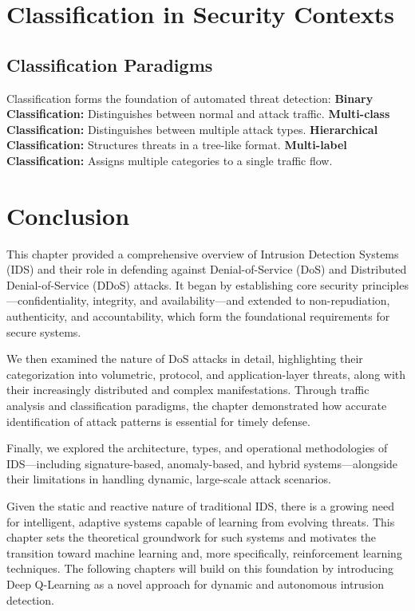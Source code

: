 \documentclass[12pt]{report}
\begin{document}
\section{Classification in Security Contexts}
\subsection{Classification Paradigms}
Classification forms the foundation of automated threat detection:
\textbf{Binary Classification:} Distinguishes between normal and attack traffic.
\textbf{Multi-class Classification:} Distinguishes between multiple attack types.
\textbf{Hierarchical Classification:} Structures threats in a tree-like format.
\textbf{Multi-label Classification:} Assigns multiple categories to a single traffic flow.

\section{Conclusion}

This chapter provided a comprehensive overview of Intrusion Detection Systems (IDS) and their role in defending against Denial-of-Service (DoS) and Distributed Denial-of-Service (DDoS) attacks. It began by establishing core security principles—confidentiality, integrity, and availability—and extended to non-repudiation, authenticity, and accountability, which form the foundational requirements for secure systems.

We then examined the nature of DoS attacks in detail, highlighting their categorization into volumetric, protocol, and application-layer threats, along with their increasingly distributed and complex manifestations. Through traffic analysis and classification paradigms, the chapter demonstrated how accurate identification of attack patterns is essential for timely defense.

Finally, we explored the architecture, types, and operational methodologies of IDS—including signature-based, anomaly-based, and hybrid systems—alongside their limitations in handling dynamic, large-scale attack scenarios.

Given the static and reactive nature of traditional IDS, there is a growing need for intelligent, adaptive systems capable of learning from evolving threats. This chapter sets the theoretical groundwork for such systems and motivates the transition toward machine learning and, more specifically, reinforcement learning techniques. The following chapters will build on this foundation by introducing Deep Q-Learning as a novel approach for dynamic and autonomous intrusion detection.
\end{document}
